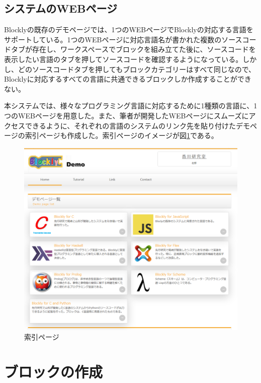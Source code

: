 \documentclass{risepaper}
\begin{document}
   \subsection{システムのWEBページ}
   
Blocklyの既存のデモページでは、1つのWEBページでBlocklyの対応する言語をサポートしている。1つのWEBページに対応言語名が書かれた複数のソースコードタブが存在し、ワークスペースでブロックを組み立てた後に、ソースコードを表示したい言語のタブを押してソースコードを確認するようになっている。しかし、どのソースコードタブを押してもブロックカテゴリーはすべて同じなので、Blocklyに対応するすべての言語に共通できるブロックしか作成することができない。

本システムでは、様々なプログラミング言語に対応するために1種類の言語に、1つのWEBページを用意した。また、筆者が開発したWEBページにスムーズにアクセスできるように、それぞれの言語のシステムのリンク先を貼り付けたデモページの索引ページも作成した。索引ページのイメージが図\ref{fig:index}である。

\begin{figure}[h]
\begin{center}
\includegraphics[scale=0.5]{img/index.PNG}
\caption{索引ページ}%
\label{fig:index}
\end{center}%
\end{figure}%
   
   \section{ブロックの作成}
\end{document}
